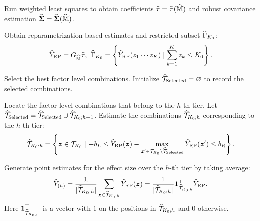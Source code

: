 \documentclass[12pt]{article}
\begin{document}
\begin{algorithm}[!htbp]
\DontPrintSemicolon
{}                %

    
    Run weighted least squares to obtain coefficients $\widehat{\tau} = \widehat{\tau}(\widehat{{\mathbb{M}}})$ and robust covariance estimation $\widehat{{\boldsymbol{\Sigma}}} = \widehat{{\boldsymbol{\Sigma}}}(\widehat{{\mathbb{M}}})$.
    
    \label{alg:hatY-RP} Obtain reparametrization-based estimates and restricted subset ${\widehat{\Gamma}}_{K_0}$:
    \begin{align*}
        \widehat{Y}_{\operatorname{RP}} = G_{\widehat{{\mathbb{M}}}} {\widehat{\tau}}, ~{\widehat{\Gamma}}_{K_0} = \left\{{\widehat{Y}}_{\operatorname{RP}}(z_1\cdots z_K)\mid \sum_{k=1}^K z_k \le K_0\right\}.
    \end{align*}
    
    Select the best factor level combinations. Initialize $\widehat{{\mathcal{T}}}_{\operatorname{Selected}} = \varnothing$ to record the selected combinations.
    {
      \label{alg:select-cT} Locate the factor level combinations that belong to the $h$-th tier. Let $\widehat{{\mathcal{T}}}_{\operatorname{Selected}} = \widehat{{\mathcal{T}}}_{\operatorname{Selected}} \cup \widehat{{\mathcal{T}}}_{K_0;h-1}$.   Estimate the combinations $\widehat{{\mathcal{T}}}_{K_0;h}$ corresponding to the $h$-th tier:
      \begin{align*}
          \widehat{{\mathcal{T}}}_{K_0;h} = \left\{{\boldsymbol{z}}\in{\mathcal{T}}_{K_0}\mid -b_L\le {\widehat{Y}}_{\operatorname{RP}}({\boldsymbol{z}})-\max_{{\boldsymbol{z}}'\in{\mathcal{T}}_{K_0}\backslash\widehat{{\mathcal{T}}}_{\operatorname{Selected}}}{\widehat{Y}}_{\operatorname{RP}}({\boldsymbol{z}}') \le b_R\right\}.
      \end{align*}

      \label{alg:point-est} Generate point estimates for the effect size over the $h$-th tier by taking average:
      \begin{align*}
         {\widehat{Y}}_{(h)} = \frac{1}{|\widehat{{\mathcal{T}}}_{K_0;h}|} \sum_{{\boldsymbol{z}}\in \widehat{{\mathcal{T}}}_{K_0;h}} {\widehat{Y}}_{\operatorname{RP}}({\boldsymbol{z}}) = \frac{1}{|\widehat{{\mathcal{T}}}_{K_0;h}|} {\boldsymbol{1}}_{\widehat{{\mathcal{T}}}_{K_0;h}}^\top {\widehat{Y}}_{\operatorname{RP}}. 
      \end{align*}
      Here ${\boldsymbol{1}}_{\widehat{{\mathcal{T}}}_{K_0;h}}^\top$ is a vector with $1$ on the positions in $\widehat{{\mathcal{T}}}_{K_0;h}$ and $0$ otherwise.

}
\end{algorithm}
\end{document}
